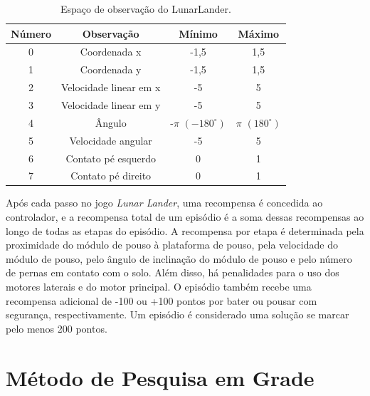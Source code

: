 \documentclass[12pt,           %
a4paper,                       %
openany,                       %
oneside,                       %
chapter=TITLE,                 %
english,                       %
spanish,                       %
brazil,                        %
sumario=tradicional]{abntex2}  %
\begin{document}
\begin{OnehalfSpace}
\begin{table}[H]
	\centering
	\vspace*{-0.2cm}
	\caption{Espaço de observação do LunarLander.}
        \begin{tabular}{|c|c|c|c|}
        	\hline
              Número & Observação & Mínimo & Máximo\\
             \hline
            0 & Coordenada x & -1,5 & 1,5\\
            \hline
            1 & Coordenada y & -1,5 & 1,5\\
            \hline
            2 & Velocidade linear em x &  -5 & 5\\
            \hline
            3 & Velocidade linear em y &  -5 & 5\\
            \hline
            4 & Ângulo & -$\pi$  $(-180^\circ)$ & $\pi$ $(180^\circ)$\\
            \hline
            5 & Velocidade angular &  -5 & 5\\
            \hline
            6 & Contato pé esquerdo &  0 & 1\\
            \hline
            7 & Contato pé direito &  0 & 1\\
        \hline
        \end{tabular}
        \label{tab:outlunarlander}                 %
    \end{table}
\vspace*{-.655cm}
{\raggedright {}}


Após cada passo no jogo \textit{Lunar Lander}, uma recompensa é concedida ao controlador, e a recompensa total de um episódio é a soma dessas recompensas ao longo de todas as etapas do episódio. A recompensa por etapa é determinada pela proximidade do módulo de pouso à plataforma de pouso, pela velocidade do módulo de pouso, pelo ângulo de inclinação do módulo de pouso e pelo número de pernas em contato com o solo. Além disso, há penalidades para o uso dos motores laterais e do motor principal. O episódio também recebe uma recompensa adicional de -100 ou +100 pontos por bater ou pousar com segurança, respectivamente. Um episódio é considerado uma solução se marcar pelo menos 200 pontos.

\section{Método de Pesquisa em Grade}
\label{sec:MPG}


\end{OnehalfSpace}
\end{document}

